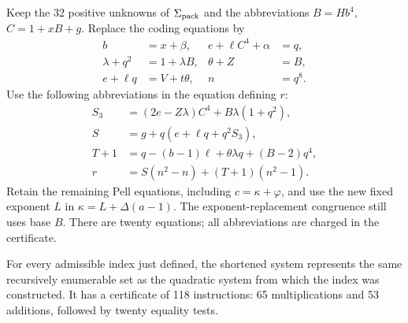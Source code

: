 Keep the 32 positive unknowns of $\Sigma_{\rm pack}$ and the
abbreviations $B=Hb^4$, $C=1+xB+g$. Replace the coding equations by
\begin{align}
 b&=x+\beta,& e+\ell C^4+\alpha&=q,\label{eq:short-bound}\\
 \lambda+q^2&=1+\lambda B,&\theta+Z&=B,\label{eq:short-geometric}\\
 e+\ell q&=V+t\theta,&n&=q^8.\label{eq:short-packed}
\end{align}
Use the following abbreviations in the equation defining $r$:
\begin{align*}
 S_3&=(2e-Z\lambda)C^4+B\lambda(1+q^2),\\
 S&=g+q(e+\ell q+q^2S_3),\\
 T+1&=q-(b-1)\ell+\theta\lambda q+(B-2)q^4,\\
 r&=S(n^2-n)+(T+1)(n^2-1).
\end{align*}
Retain the remaining Pell equations, including $c=\kappa+\varphi$,
and use the new fixed exponent $L$ in
$\kappa=L+\Delta(a-1)$. The exponent-replacement congruence still uses
base $B$. There are twenty equations; all abbreviations are charged in
the certificate.

\begin{theorem}\label{thm:short118}
For every admissible index just defined, the shortened system represents
the same recursively enumerable set as the quadratic system from which
the index was constructed. It has a certificate of 118 instructions:
65 multiplications and 53 additions, followed by twenty equality tests.
\end{theorem}

